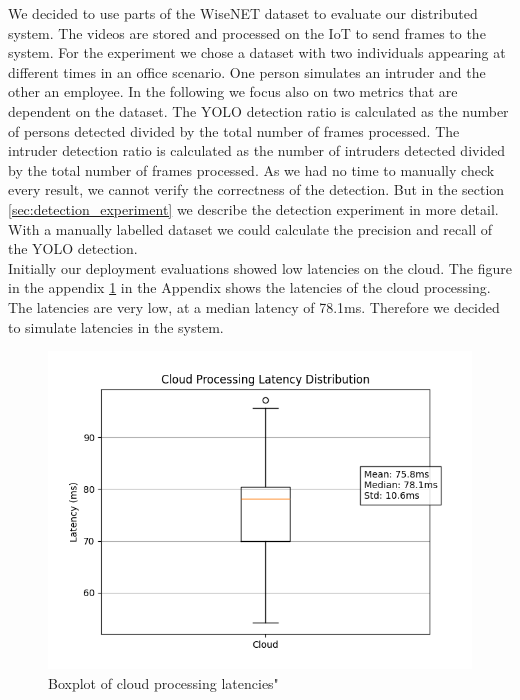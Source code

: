 \documentclass[conference]{IEEEtran}
\begin{document}
We decided to use parts of the WiseNET dataset to evaluate our distributed system. The videos are stored and processed on the IoT to send frames to the system. For the experiment we chose a dataset with two individuals appearing at different times in an office scenario.  One person simulates an intruder and the other an employee.
In the following we focus also on two metrics that are dependent on the dataset. The YOLO detection ratio is calculated as the number of persons detected divided by the total number of frames processed. The intruder detection ratio is calculated as the number of intruders detected divided by the total number of frames processed. 
As we had no time to manually check every result, we cannot verify the correctness of the detection. 
But in the section \ref{sec:detection_experiment} we describe the detection experiment in more detail. With a manually labelled dataset we could calculate the precision and recall of the YOLO detection. 
\\

Initially our deployment evaluations showed low latencies on the cloud. The figure in the appendix \ref{fig:cloud_latencies_old} in the Appendix shows the latencies of the cloud processing. The latencies are very low, at a median latency of 78.1ms. Therefore we decided to simulate latencies in the system. 

\begin{figure}[!h]
    \centering
    \includegraphics[width=1\linewidth]{./res/evaluation_without_latencies/cloud_latencies_old.png}
    \caption{Boxplot of cloud processing latencies"}
    \label{fig:cloud_latencies_old}
\end{figure}
\end{document}
